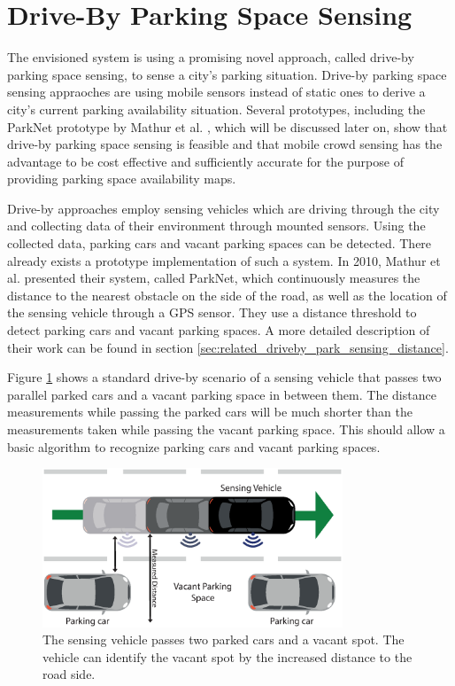 \section{Drive-By Parking Space Sensing}

The envisioned system is using a promising novel approach, called drive-by parking space sensing, to sense a city's parking situation. Drive-by parking space sensing appraoches are using mobile sensors instead of static ones to derive a city's current parking availability situation. Several prototypes, including the ParkNet prototype by Mathur et al. \cite{Mathur:2010:PDS:1814433.1814448}, which will be discussed later on, show that drive-by parking space sensing is feasible and that mobile crowd sensing has the advantage to be cost effective and sufficiently accurate for the purpose of providing parking space availability maps. 

Drive-by approaches employ sensing vehicles which are driving through the city and collecting data of their environment through mounted sensors. Using the collected data, parking cars and vacant parking spaces can be detected. There already exists a prototype implementation of such a system. In 2010, Mathur et al. \cite{Mathur:2010:PDS:1814433.1814448} presented their system, called ParkNet, which continuously measures the distance to the nearest obstacle on the side of the road, as well as the location of the sensing vehicle through a GPS sensor. They use a distance threshold to detect parking cars and vacant parking spaces. A more detailed description of their work can be found in section \ref{sec:related_driveby_park_sensing_distance}.

Figure \ref{fig:driveby_standard_parking_situation} shows a standard drive-by scenario of a sensing vehicle that passes two parallel parked cars and a vacant parking space in between them. The distance measurements while passing the parked cars will be much shorter than the measurements taken while passing the vacant parking space. This should allow a basic algorithm to recognize parking cars and vacant parking spaces.

\begin{figure}
	\centering
	\includegraphics[width=0.8\textwidth]{img/drive-by-parking-situation-pictogram.eps}
	\caption{The sensing vehicle passes two parked cars and a vacant spot. The vehicle can identify the vacant spot by the increased distance to the road side.}
	\label{fig:driveby_standard_parking_situation}
\end{figure}

